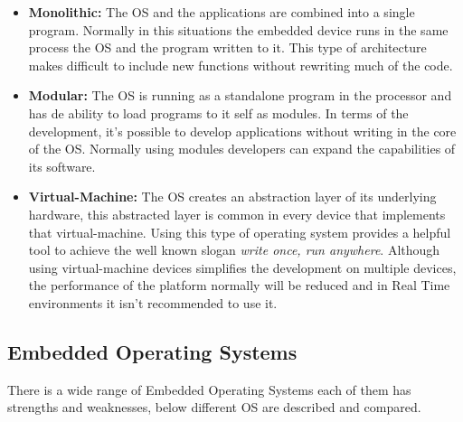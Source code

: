\begin{itemize}
\item \textbf{Monolithic:} The OS and the applications are combined into a single program. Normally in this situations the embedded device runs in the same process the OS and the program written to it. This type of architecture makes difficult to include new functions without rewriting much of the code.

\item \textbf{Modular:} The OS is running as a standalone program in the processor and has de ability to load programs to it self as modules. In terms of the development, it's possible to develop applications without writing in the core of the OS. Normally using modules developers can expand the capabilities of its software.

\item \textbf{Virtual-Machine:} The OS creates an abstraction layer of its underlying hardware, this abstracted layer is common in every device that implements that virtual-machine. Using this type of operating system provides a helpful tool to achieve the well known slogan \textit{write once, run anywhere}. Although using virtual-machine devices simplifies the development on multiple devices, the performance of the platform normally will be reduced and in Real Time environments it isn't recommended to use it.
\end{itemize}

\subsection{Embedded Operating Systems}\label{SOTA-Embedded-Operating-Systems}
There is a wide range of Embedded Operating Systems each of them has strengths and weaknesses, below different OS are described and compared.
 
